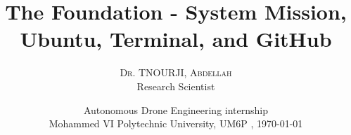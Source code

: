 \title[Short title here]{The Foundation - System Mission, Ubuntu, Terminal, and GitHub}
\author{%
    {\textsc{Dr. TNOURJI, Abdellah}} \\[0.5ex]
    Research Scientist %
}
\date{Autonomous Drone Engineering internship\\Mohammed VI Polytechnic University, UM6P   , \today} 

